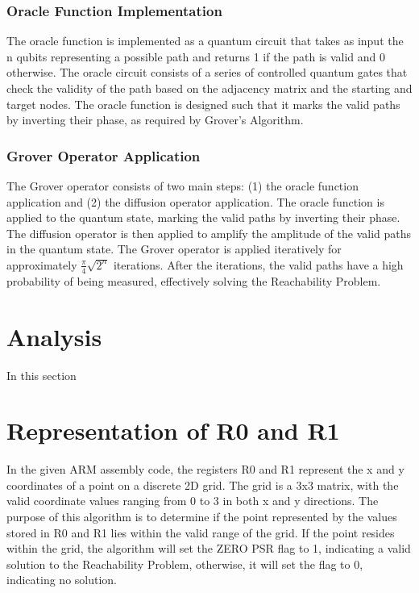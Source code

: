 \subsubsection{Oracle Function Implementation}

The oracle function is implemented as a quantum circuit that takes as input the n qubits representing a possible path and returns 1 if the path is valid and 0 otherwise. The oracle circuit consists of a series of controlled quantum gates that check the validity of the path based on the adjacency matrix and the starting and target nodes. The oracle function is designed such that it marks the valid paths by inverting their phase, as required by Grover's Algorithm.

\subsubsection{Grover Operator Application}

The Grover operator consists of two main steps: (1) the oracle function application and (2) the diffusion operator application. The oracle function is applied to the quantum state, marking the valid paths by inverting their phase. The diffusion operator is then applied to amplify the amplitude of the valid paths in the quantum state. The Grover operator is applied iteratively for approximately $\frac{\pi}{4}\sqrt{2^n}$ iterations. After the iterations, the valid paths have a high probability of being measured, effectively solving the Reachability Problem.

\section{Analysis}
\label{sec:analysis}

In this section

\section{Representation of R0 and R1}

In the given ARM assembly code, the registers R0 and R1 represent the x and y coordinates of a point on a discrete 2D grid. The grid is a 3x3 matrix, with the valid coordinate values ranging from 0 to 3 in both x and y directions. The purpose of this algorithm is to determine if the point represented by the values stored in R0 and R1 lies within the valid range of the grid. If the point resides within the grid, the algorithm will set the ZERO PSR flag to 1, indicating a valid solution to the Reachability Problem, otherwise, it will set the flag to 0, indicating no solution. 

